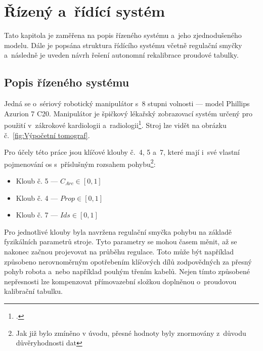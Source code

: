 \section{Řízený a~řídící systém}\label{section: řízený a~říddící systém}
Tato kapitola je zaměřena na popis řízeného systému a~jeho zjednodušeného modelu. Dále je popsána struktura řídícího systému včetně regulační smyčky a~následně je uveden návrh řešení autonomní rekalibrace proudové tabulky.
\subsection{Popis řízeného systému}
Jedná se o~sériový robotický manipulátor s~8 stupni volnosti --- model Phillips Azurion 7 C20. Manipulátor je špičkový lékařský zobrazovací systém určený pro použití v~zákrokové kardiologii a~radiologii\footcite{AzurionPage}. Stroj lze vidět na obrázku č.~\ref{fig:Výpočetní tomograf}.\par
Pro účely této práce jsou klíčové klouby č.~4, 5 a~7, které mají i~své vlastní pojmenování os s~příslušným rozsahem pohybu\footnote{Jak již bylo zmíněno v úvodu, přesné hodnoty byly znormovány z~důvodu důvěryhodnosti dat}:
\begin{itemize}
    \item Kloub č. 5 --- $C_{Arc}\in[0, 1]$
    \item Kloub č. 4 --- $Prop\in[0, 1]$
    \item Kloub č. 7 --- $Ids\in[0, 1]$
\end{itemize}
Pro jednotlivé klouby byla navržena regulační smyčka pohybu na základě fyzikálních parametrů stroje. Tyto parametry se mohou časem měnit, až se nakonec začnou projevovat na průběhu regulace. Toto může být například způsobeno nerovnoměrným opotřebením klíčových dílů zodpovědných za přesný pohyb robota a~nebo například pouhým třením kabelů. Nejen tímto způsobené nepřesnosti lze kompenzovat přímovazební složkou doplněnou o~proudovou kalibrační tabulku.


